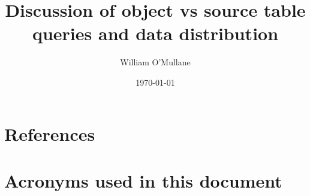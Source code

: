 \documentclass[PST,authoryear,toc]{lsstdoc}
\title{Discussion of object vs source table queries and data distribution}
\author{%
William O'Mullane
}
\date{\today}
\begin{document}

\mkshorttitle




\appendix
\section{References} \label{sec:bib}


\section{Acronyms used in this document}\label{sec:acronyms}

\end{document}
